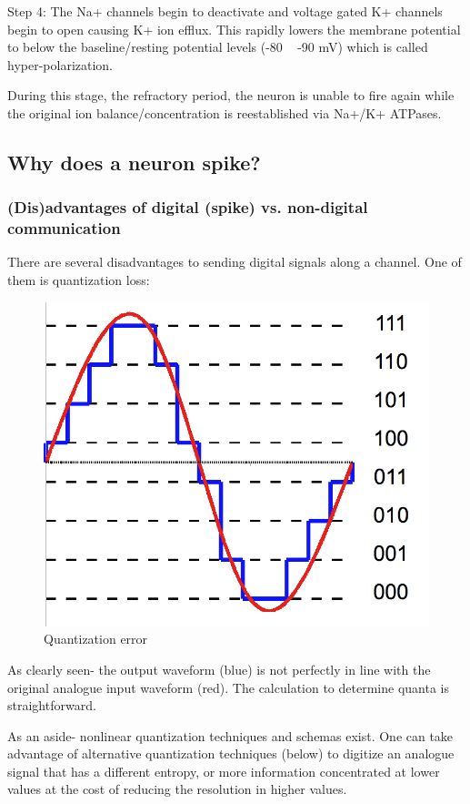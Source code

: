 \documentclass[main]{subfiles}
\begin{document}
Step 4: The Na+ channels begin to deactivate and voltage gated K+ channels begin to open causing K+ ion efflux. This rapidly lowers the membrane potential to below the baseline/resting potential levels (-80 ~ -90 mV) which is called hyper-polarization.

During this stage, the refractory period, the neuron is unable to fire again while the original ion balance/concentration is reestablished via Na+/K+ ATPases.

\subsection{Why does a neuron spike?}
\subsubsection{(Dis)advantages of digital (spike) vs. non-digital communication}

There are several disadvantages to sending digital signals along a channel.
One of them is quantization loss:

\begin{figure}[H]
	\centering
	\includegraphics[width=0.9\linewidth]{09_WhySpikes/figures/3-bit_resolution_analog_comparison.png}
	\caption{Quantization error}
\end{figure}

As clearly seen- the output waveform (blue) is not perfectly in line with the original analogue input waveform (red). The calculation to determine quanta is straightforward.

As an aside- nonlinear quantization techniques and schemas exist. One can take advantage of alternative quantization techniques (below) to digitize an analogue signal that has a different entropy, or more information concentrated at lower values at the cost of reducing the resolution in higher values.
\end{document}
